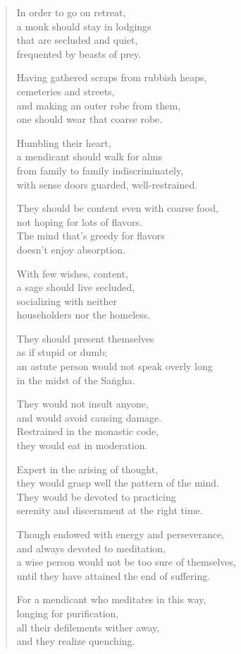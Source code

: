\documentclass[12pt,openany]{book}%
\begin{document}
\begin{verse}%
In order to go on retreat, \\
a monk should stay in lodgings \\
that are secluded and quiet, \\
frequented by beasts of prey. 

Having gathered scraps from rubbish heaps, \\
cemeteries and streets, \\
and making an outer robe from them, \\
one should wear that coarse robe. 

Humbling their heart, \\
a mendicant should walk for alms \\
from family to family indiscriminately, \\
with sense doors guarded, well-restrained. 

They should be content even with coarse food, \\
not hoping for lots of flavors. \\
The mind that’s greedy for flavors \\
doesn’t enjoy absorption. 

With few wishes, content, \\
a sage should live secluded, \\
socializing with neither \\
householders nor the homeless. 

They should present themselves \\
as if stupid or dumb; \\
an astute person would not speak overly long \\
in the midst of the \textsanskrit{Saṅgha}. 

They would not insult anyone, \\
and would avoid causing damage. \\
Restrained in the monastic code, \\
they would eat in moderation. 

Expert in the arising of thought, \\
they would grasp well the pattern of the mind. \\
They would be devoted to practicing \\
serenity and discernment at the right time. 

Though endowed with energy and perseverance, \\
and always devoted to meditation, \\
a wise person would not be too sure of themselves, \\
until they have attained the end of suffering. 

For a mendicant who meditates in this way, \\
longing for purification, \\
all their defilements wither away, \\
and they realize quenching. 

%
\end{verse}
\end{document}
